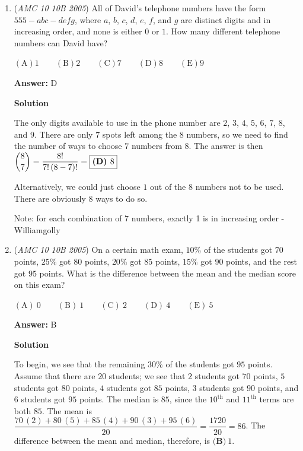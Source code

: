 \begin{enumerate}
 


	\item (\textit{AMC 10 10B 2005}) All of David's telephone numbers have the form $555-abc-defg$, where $a$, $b$, $c$, $d$, $e$, $f$, and $g$ are distinct digits and in increasing order, and none is either $0$ or $1$. How many different telephone numbers can David have?


 $\mathrm{(A)} 1 \qquad \mathrm{(B)} 2 \qquad \mathrm{(C)} 7 \qquad \mathrm{(D)} 8 \qquad \mathrm{(E)} 9$

 \textbf{Answer: }D



\textbf{Solution}

The only digits available to use in the phone number are $2$, $3$, $4$, $5$, $6$, $7$, $8$, and $9$. There are only $7$ spots left among the $8$ numbers, so we need to find the number of ways to choose $7$ numbers from $8$. The answer is then $\dbinom{8}{7}=\dfrac{8!}{7!\,(8-7)!}=\boxed{\textbf{(D) } 8}$

 Alternatively, we could just choose $1$ out of the $8$ numbers not to be used. There are obviously $\boxed{8}$ ways to do so.

 Note: for each combination of 7 numbers, exactly 1 is in increasing order -Williamgolly

 


	\item (\textit{AMC 10 10B 2005}) On a certain math exam, $10\%$ of the students got $70$ points, $25\%$ got $80$ points, $20\%$ got $85$ points, $15\%$ got $90$ points, and the rest got $95$ points. What is the difference between the mean and the median score on this exam?


 $\mathrm{(A)}\ 0 \qquad \mathrm{(B)}\ 1 \qquad \mathrm{(C)}\ 2 \qquad \mathrm{(D)}\ 4 \qquad \mathrm{(E)}\ 5$

 \textbf{Answer: }B



\textbf{Solution}

To begin, we see that the remaining $30\%$ of the students got $95$ points. Assume that there are $20$ students; we see that $2$ students got $70$ points, $5$ students got $80$ points, $4$ students got $85$ points, $3$ students got $90$ points, and $6$ students got $95$ points. The median is $85$, since the $10^{\text{th}}$ and $11^{\text{th}}$ terms are both $85$. The mean is $\dfrac{70\,(2)+80\,(5)+85\,(4)+90\,(3)+95\,(6)}{20}=\dfrac{1720}{20}=86$. The difference between the mean and median, therefore, is $\boxed{\textbf{(B)}\ 1}$.


\end{enumerate}
